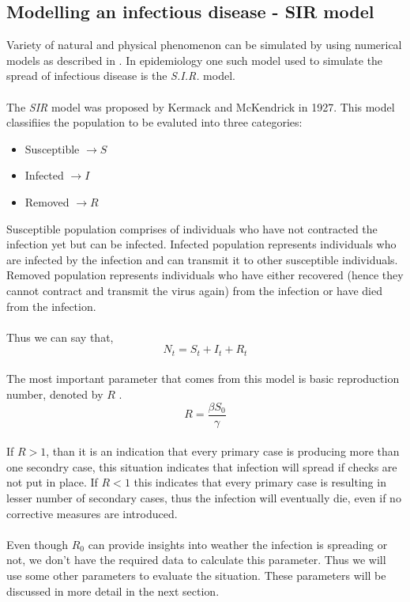 \documentclass[12pt, twosided]{report}  %
\begin{document}
\subsection*{Modelling an infectious disease - SIR model}
Variety of natural and physical phenomenon can be simulated by using numerical models as described in \cite{scharnhorst2012models}. In epidemiology one such model used to simulate the spread of infectious disease is the \textit{S.I.R.} model.
\\
\\
The \textit{SIR} model was proposed by Kermack and McKendrick \cite{kermack1927contribution} in 1927. This model classifiies the population to be evaluted into three categories:
\begin{itemize}
	\item Susceptible $\rightarrow S $
	\item Infected $\rightarrow I $
	\item Removed $\rightarrow R $
\end{itemize}
Susceptible population comprises of individuals who have not contracted the infection yet but can be infected. Infected population represents individuals who are infected by the infection and can transmit it to other susceptible individuals. Removed population represents individuals who have either recovered (hence they cannot contract and transmit the virus again) from the infection or have died from the infection.
\\
\\
Thus we can say that,
$$ N_t = S_t + I_t + R_t $$
\\
The most important parameter that comes from this model is basic reproduction number, denoted by $R$ .
$$ R = \frac{\beta S_0}{\gamma}$$
\\
If $R > 1$, than it is an indication that every primary case is producing more than one secondry case, this situation indicates that infection will spread if checks are not put in place. If $R < 1$ this indicates that every primary case is resulting in lesser number of secondary cases, thus the infection will eventually die, even if no corrective measures are introduced.
\\
\\
Even though $R_0$ can provide insights into weather the infection is spreading or not, we don't have the required data to calculate this parameter. Thus we will use some other parameters to evaluate the situation. These parameters will be discussed in more detail in the next section.
\end{document}
